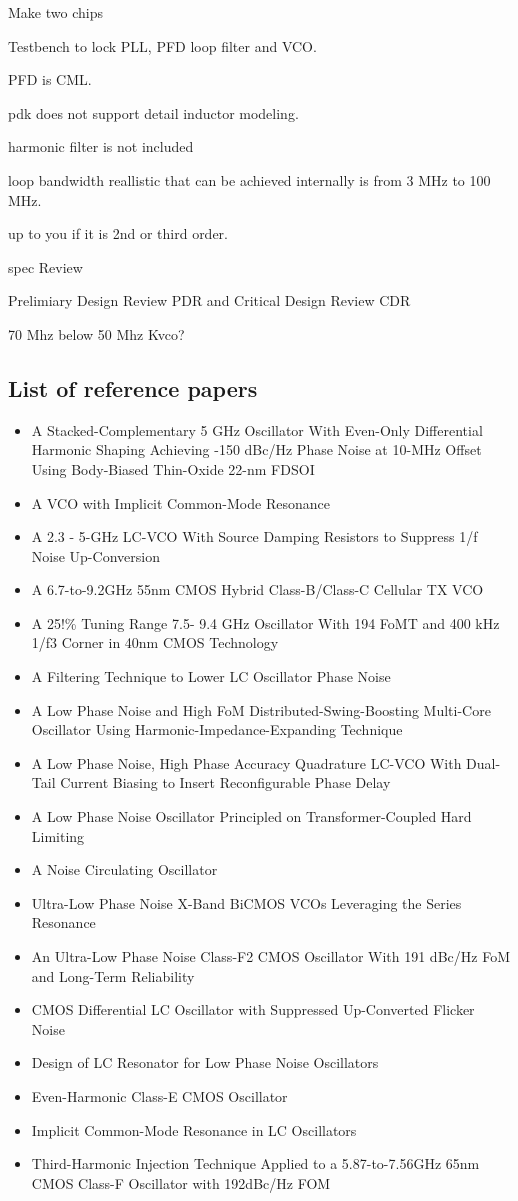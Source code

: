 \documentclass{article}
\begin{document}
Make two chips

Testbench to lock PLL, PFD loop filter and VCO.

PFD is CML.

pdk does not support detail inductor modeling.

harmonic filter is not included

loop bandwidth reallistic that can be achieved internally is from 3 MHz to 100 MHz.

up to you if it is 2nd or third order.

spec Review

Prelimiary Design Review PDR
and Critical Design Review CDR

70 Mhz below 50 Mhz Kvco?

\subsection{List of reference papers} %

\begin{itemize}
	\item A Stacked-Complementary 5 GHz Oscillator With Even-Only Differential Harmonic Shaping Achieving -150 dBc/Hz Phase Noise at 10-MHz Offset Using Body-Biased Thin-Oxide 22-nm FDSOI
	\item A VCO with Implicit Common-Mode Resonance
	\item A 2.3 - 5-GHz LC-VCO With Source Damping Resistors to Suppress 1/f Noise Up-Conversion
	\item A 6.7-to-9.2GHz 55nm CMOS Hybrid Class-B/Class-C Cellular TX VCO
	\item A 25!\% Tuning Range 7.5- 9.4 GHz Oscillator With 194 FoMT and 400 kHz 1/f3 Corner in 40nm CMOS Technology
	\item A Filtering Technique to Lower LC Oscillator Phase Noise
	\item A Low Phase Noise and High FoM Distributed-Swing-Boosting Multi-Core Oscillator Using Harmonic-Impedance-Expanding Technique
	\item A Low Phase Noise, High Phase Accuracy Quadrature LC-VCO With Dual-Tail Current Biasing to Insert Reconfigurable Phase Delay
	\item A Low Phase Noise Oscillator Principled on Transformer-Coupled Hard Limiting
	\item A Noise Circulating Oscillator
	\item Ultra-Low Phase Noise X-Band BiCMOS VCOs Leveraging the Series Resonance
	\item An Ultra-Low Phase Noise Class-F2 CMOS Oscillator With 191 dBc/Hz FoM and Long-Term Reliability
	\item CMOS Differential LC Oscillator with Suppressed Up-Converted Flicker Noise
	\item Design of LC Resonator for Low Phase Noise Oscillators
	\item Even-Harmonic Class-E CMOS Oscillator
	\item Implicit Common-Mode Resonance in LC Oscillators
	\item Third-Harmonic Injection Technique Applied to a 5.87-to-7.56GHz 65nm CMOS Class-F Oscillator with 192dBc/Hz FOM
\end{itemize}
\end{document}
